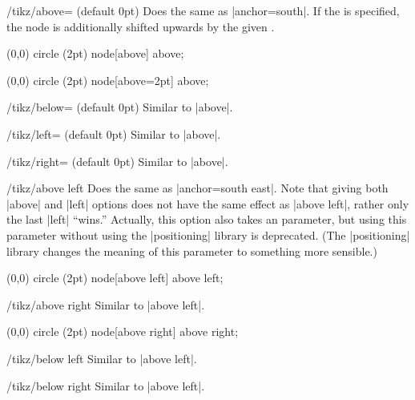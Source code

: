 \begin{key}{/tikz/above= (default 0pt)}
  Does the same as |anchor=south|. If the  is specified,
  the node is additionally shifted upwards by the given
  .
\begin{codeexample}[]
\tikz \fill (0,0) circle (2pt) node[above] {above};
\end{codeexample}
\begin{codeexample}[]
\tikz \fill (0,0) circle (2pt) node[above=2pt] {above};
\end{codeexample}
\end{key}

\begin{key}{/tikz/below= (default 0pt)}
  Similar to |above|.
\end{key}

\begin{key}{/tikz/left= (default 0pt)}
  Similar to |above|.
\end{key}

\begin{key}{/tikz/right= (default 0pt)}
  Similar to |above|.
\end{key}

\begin{key}{/tikz/above left}
  Does the same as |anchor=south east|. Note that giving both |above|
  and |left| options does not have the same effect as |above left|,
  rather only the last |left| ``wins.'' Actually, this option also
  takes an  parameter, but using this parameter without
  using the |positioning| library is deprecated. (The |positioning|
  library changes the meaning of this parameter to something more
  sensible.)
\begin{codeexample}[]
\tikz \fill (0,0) circle (2pt) node[above left] {above left};
\end{codeexample}
\end{key}

\begin{key}{/tikz/above right}
  Similar to  |above left|.
\begin{codeexample}[]
\tikz \fill (0,0) circle (2pt) node[above right] {above right};
\end{codeexample}
\end{key}

\begin{key}{/tikz/below left}
  Similar to |above left|.
\end{key}
\begin{key}{/tikz/below right}
  Similar to |above left|.
\end{key}


